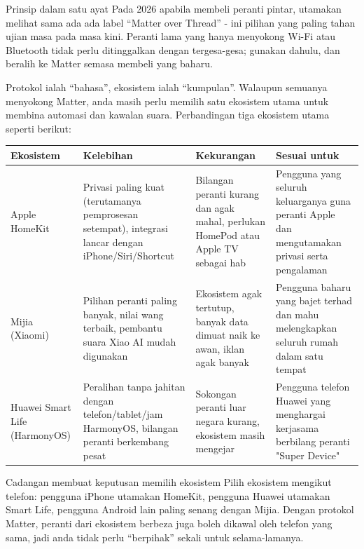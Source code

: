 \begin{tcbinfo}{Prinsip dalam satu ayat}
Pada 2026 apabila membeli peranti pintar, utamakan melihat sama ada ada label “Matter over Thread” - ini pilihan yang paling tahan ujian masa pada masa kini. Peranti lama yang hanya menyokong Wi-Fi atau Bluetooth tidak perlu ditinggalkan dengan tergesa-gesa; gunakan dahulu, dan beralih ke Matter semasa membeli yang baharu.

\end{tcbinfo}


Protokol ialah “bahasa”, ekosistem ialah “kumpulan”. Walaupun semuanya menyokong Matter, anda masih perlu memilih satu ekosistem utama untuk membina automasi dan kawalan suara. Perbandingan tiga ekosistem utama seperti berikut:

\begin{center}
\begin{tabularx}{\linewidth}{|X|X|X|X|}
\hline
\textbf{Ekosistem} & \textbf{Kelebihan} & \textbf{Kekurangan} & \textbf{Sesuai untuk} \tabularnewline
\hline
Apple HomeKit & Privasi paling kuat (terutamanya pemprosesan setempat), integrasi lancar dengan iPhone/Siri/Shortcut & Bilangan peranti kurang dan agak mahal, perlukan HomePod atau Apple TV sebagai hab & Pengguna yang seluruh keluarganya guna peranti Apple dan mengutamakan privasi serta pengalaman \tabularnewline
Mijia (Xiaomi) & Pilihan peranti paling banyak, nilai wang terbaik, pembantu suara Xiao AI mudah digunakan & Ekosistem agak tertutup, banyak data dimuat naik ke awan, iklan agak banyak & Pengguna baharu yang bajet terhad dan mahu melengkapkan seluruh rumah dalam satu tempat \tabularnewline
Huawei Smart Life (HarmonyOS) & Peralihan tanpa jahitan dengan telefon/tablet/jam HarmonyOS, bilangan peranti berkembang pesat & Sokongan peranti luar negara kurang, ekosistem masih mengejar & Pengguna telefon Huawei yang menghargai kerjasama berbilang peranti "Super Device" \tabularnewline
\hline
\end{tabularx}
\end{center}

\begin{tcbinfo}{Cadangan membuat keputusan memilih ekosistem}
Pilih ekosistem mengikut telefon: pengguna iPhone utamakan HomeKit, pengguna Huawei utamakan Smart Life, pengguna Android lain paling senang dengan Mijia. Dengan protokol Matter, peranti dari ekosistem berbeza juga boleh dikawal oleh telefon yang sama, jadi anda tidak perlu “berpihak” sekali untuk selama-lamanya.

\end{tcbinfo}

